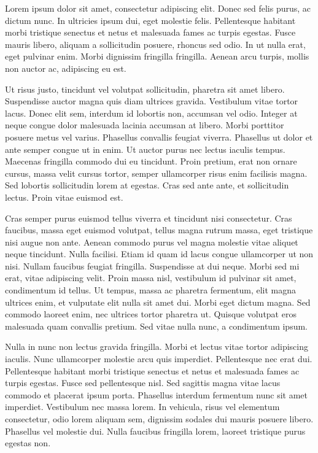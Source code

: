 Lorem ipsum dolor sit amet, consectetur adipiscing elit. Donec sed felis purus, ac dictum nunc. In ultricies ipsum dui, eget molestie felis. Pellentesque habitant morbi tristique senectus et netus et malesuada fames ac turpis egestas. Fusce mauris libero, aliquam a sollicitudin posuere, rhoncus sed odio. In ut nulla erat, eget pulvinar enim. Morbi dignissim fringilla fringilla. Aenean arcu turpis, mollis non auctor ac, adipiscing eu est.

Ut risus justo, tincidunt vel volutpat sollicitudin, pharetra sit amet libero. Suspendisse auctor magna quis diam ultrices gravida. Vestibulum vitae tortor lacus. Donec elit sem, interdum id lobortis non, accumsan vel odio. Integer at neque congue dolor malesuada lacinia accumsan at libero. Morbi porttitor posuere metus vel varius. Phasellus convallis feugiat viverra. Phasellus ut dolor et ante semper congue ut in enim. Ut auctor purus nec lectus iaculis tempus. Maecenas fringilla commodo dui eu tincidunt. Proin pretium, erat non ornare cursus, massa velit cursus tortor, semper ullamcorper risus enim facilisis magna. Sed lobortis sollicitudin lorem at egestas. Cras sed ante ante, et sollicitudin lectus. Proin vitae euismod est.

Cras semper purus euismod tellus viverra et tincidunt nisi consectetur. Cras faucibus, massa eget euismod volutpat, tellus magna rutrum massa, eget tristique nisi augue non ante. Aenean commodo purus vel magna molestie vitae aliquet neque tincidunt. Nulla facilisi. Etiam id quam id lacus congue ullamcorper ut non nisi. Nullam faucibus feugiat fringilla. Suspendisse at dui neque. Morbi sed mi erat, vitae adipiscing velit. Proin massa nisl, vestibulum id pulvinar sit amet, condimentum id tellus. Ut tempus, massa ac pharetra fermentum, elit magna ultrices enim, et vulputate elit nulla sit amet dui. Morbi eget dictum magna. Sed commodo laoreet enim, nec ultrices tortor pharetra ut. Quisque volutpat eros malesuada quam convallis pretium. Sed vitae nulla nunc, a condimentum ipsum.

Nulla in nunc non lectus gravida fringilla. Morbi et lectus vitae tortor adipiscing iaculis. Nunc ullamcorper molestie arcu quis imperdiet. Pellentesque nec erat dui. Pellentesque habitant morbi tristique senectus et netus et malesuada fames ac turpis egestas. Fusce sed pellentesque nisl. Sed sagittis magna vitae lacus commodo et placerat ipsum porta. Phasellus interdum fermentum nunc sit amet imperdiet. Vestibulum nec massa lorem. In vehicula, risus vel elementum consectetur, odio lorem aliquam sem, dignissim sodales dui mauris posuere libero. Phasellus vel molestie dui. Nulla faucibus fringilla lorem, laoreet tristique purus egestas non.

